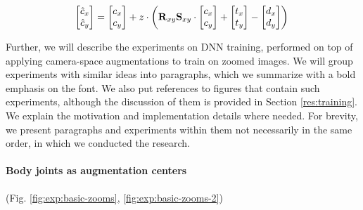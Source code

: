 \begin{equation}
	\begin{bmatrix} 
		\hat{c}_x \\ 
		\hat{c}_y \\
	\end{bmatrix} = \begin{bmatrix} 
		c_x \\ 
		c_y \\
	\end{bmatrix} + 
	z \cdot \left(
		\bm{\mathrm{R}}_{xy} \bm{\mathrm{S}}_{xy} \cdot \begin{bmatrix} 
			c_x \\ 
			c_y \\
		\end{bmatrix} + \begin{bmatrix} 
			t_x\\ 
			t_y\\
		\end{bmatrix}
		- \begin{bmatrix} 
			d_x\\ 
			d_y\\
		\end{bmatrix}
	\right)
	\label{methods:eq:cam-aug-shift-center}\\
\end{equation}

Further, we will describe the experiments on DNN training, performed on top of applying camera-space augmentations to train on zoomed images. We will group experiments with similar ideas into paragraphs, which we summarize with a bold emphasis on the font. We also put references to figures that contain such experiments, although the discussion of them is provided in Section \ref{res:training}. We explain the motivation and implementation details where needed. For brevity, we present paragraphs and experiments within them not necessarily in the same order, in which we conducted the research.

\vspace{-15pt}\paragraph{Body joints as augmentation centers}(Fig. \ref{fig:exp:basic-zooms}, \ref{fig:exp:basic-zooms-2})\mbox{}\nopagebreak

